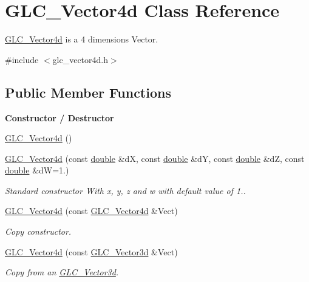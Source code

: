 \hypertarget{class_g_l_c___vector4d}{\section{G\-L\-C\-\_\-\-Vector4d Class Reference}
\label{class_g_l_c___vector4d}
}


\hyperlink{class_g_l_c___vector4d}{G\-L\-C\-\_\-\-Vector4d} is a 4 dimensions Vector.  




{\ttfamily \#include $<$glc\-\_\-vector4d.\-h$>$}

\subsection*{Public Member Functions}
\begin{Indent}{\bf Constructor / Destructor}\par
\begin{DoxyCompactItemize}
\item 
\hyperlink{class_g_l_c___vector4d_a6f3e2d726764678542a23024cfdb045c}{G\-L\-C\-\_\-\-Vector4d} ()
\item 
\hyperlink{class_g_l_c___vector4d_a1626390e96606685f68f6f6478788c8e}{G\-L\-C\-\_\-\-Vector4d} (const \hyperlink{_super_l_u_support_8h_a8956b2b9f49bf918deed98379d159ca7}{double} \&d\-X, const \hyperlink{_super_l_u_support_8h_a8956b2b9f49bf918deed98379d159ca7}{double} \&d\-Y, const \hyperlink{_super_l_u_support_8h_a8956b2b9f49bf918deed98379d159ca7}{double} \&d\-Z, const \hyperlink{_super_l_u_support_8h_a8956b2b9f49bf918deed98379d159ca7}{double} \&d\-W=1.)
\begin{DoxyCompactList}\small\item\em Standard constructor With x, y, z and w with default value of 1.. \end{DoxyCompactList}\item 
\hyperlink{class_g_l_c___vector4d_ae6db62496bad7cb1453fc761448dd370}{G\-L\-C\-\_\-\-Vector4d} (const \hyperlink{class_g_l_c___vector4d}{G\-L\-C\-\_\-\-Vector4d} \&Vect)
\begin{DoxyCompactList}\small\item\em Copy constructor. \end{DoxyCompactList}\item 
\hyperlink{class_g_l_c___vector4d_a24a48f863ffdca40ab6d4eee222a67e0}{G\-L\-C\-\_\-\-Vector4d} (const \hyperlink{class_g_l_c___vector3d}{G\-L\-C\-\_\-\-Vector3d} \&Vect)
\begin{DoxyCompactList}\small\item\em Copy from an \hyperlink{class_g_l_c___vector3d}{G\-L\-C\-\_\-\-Vector3d}. \end{DoxyCompactList}\item 

\end{DoxyCompactItemize}
\end{Indent}

